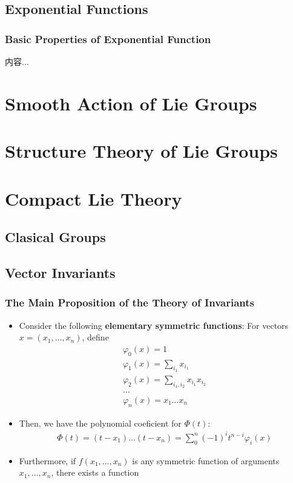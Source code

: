 \documentclass[Total.tex]{subfiles}
\begin{document}
		\section{Exponential Functions}
			\subsection{Basic Properties of Exponential Function}
		
			\begin{Def}
				内容...
			\end{Def}
			
	\chapter{Smooth Action of Lie Groups}
	\chapter{Structure Theory of Lie Groups}
	\chapter{Compact Lie Theory}
		\section{Clasical Groups}
		\section{Vector Invariants}
			\subsection{The Main Proposition of the Theory of Invariants}
				\begin{Def}
					\begin{itemize}
						\item Consider the following \textbf{elementary symmetric functions}: For vectors $x=(x_1,\dots,x_n)$, define
						\begin{gather*}
							\varphi_0(x)=1\\
							\varphi_1(x)=\sum_{i_1} x_{i_1}\\
							\varphi_2(x)=\sum_{i_1,i_2} x_{i_1}x_{i_2}\\
							\dots\\
							\varphi_n(x)=x_1\dots x_n
						\end{gather*}
						\item Then, we have the polynomial coeficient for $\Phi(t)$:
						\begin{gather*}
							\Phi(t)=(t-x_1)\dots (t-x_n)=\sum_0^n (-1)^{i}t^{n-i}\varphi_i(x)
						\end{gather*}
						\item Furthermore, if $f(x_1,\dots,x_n)$ is any symmetric function of arguments $x_1,\dots,x_n$, there exists a function
					\end{itemize}
				\end{Def}
				
\end{document}
